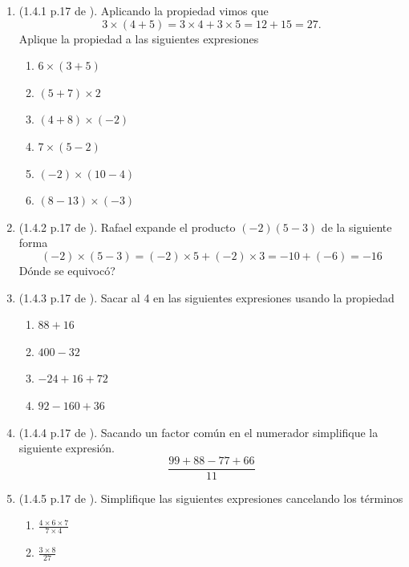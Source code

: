 \begin{enumerate}
		\item (1.4.1 p.17 de \cite{Aops_algebra}). 
		Aplicando la propiedad vimos que 
		\[3\times (4+5) = 3\times 4 + 3\times 5 = 12+15=27.\]
		Aplique la propiedad a las siguientes expresiones
				\begin{multicols}{2}
					\begin{enumerate}[label=(\Alph*)]
						\item $6\times(3+5)$		
						\item $(5+7)\times 2$		
						\item $(4+8)\times (-2)$
						\item $7\times(5-2)$
						\item $(-2)\times (10-4)$
						\item $(8-13)\times(-3)$
					\end{enumerate}	
				\end{multicols}
	\item (1.4.2 p.17 de \cite{Aops_algebra}). Rafael expande el producto $(-2)(5-3)$ de la siguiente forma 
	\[
			(-2)\times (5-3)=(-2)\times 5 + (-2)\times 3 = -10 + (-6) =-16
	\]
	Dónde se equivocó?
	
	\item (1.4.3 p.17 de \cite{Aops_algebra}).  Sacar al 4 en las siguientes expresiones usando la propiedad
			\begin{multicols}{2}
				\begin{enumerate}[label=(\Alph*)]
					\item $88+16$		
					\item $400-32$		
					\item $-24+16+72$
					\item $92-160+36$
				\end{enumerate}	
			\end{multicols}
	
	\item (1.4.4 p.17 de \cite{Aops_algebra}).   Sacando un factor común en el numerador simplifique la siguiente expresión.
	\[
			\frac{99+88-77+66}{11}
	\]
	
	\item (1.4.5 p.17 de \cite{Aops_algebra}). Simplifique las siguientes expresiones cancelando los términos 
			\begin{multicols}{2}
				\begin{enumerate}[label=(\Alph*)]
					\item $\frac{4\times 6\times 7}{7\times 4}$
					\item $\frac{3\times 8 }{27}$
				\end{enumerate}	
			\end{multicols}
\end{enumerate}
\newpage

